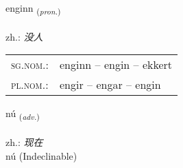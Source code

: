 \documentclass[frontgrid, backgrid]{flacards}\usepackage[]{graphicx}\usepackage[]{xcolor}
\begin{document}
\renewcommand{\flhead}{\vskip5pt \fboxsep=0pt {\small\bfseries\footnotesize Fornafn | 代词}}
\renewcommand{\fcfoot}{\vskip5pt \fboxsep=0pt \hspace{2pt}{\small\bfseries\footnotesize 1K}}

\renewcommand{\blhead}{\vskip5pt {\small\bfseries\footnotesize Fornafn | 代词 }}
\renewcommand{\bcfoot}{\vskip5pt \hspace{2pt}{\small\bfseries\footnotesize 1K}}


{enginn \small{\textsubscript{(\textit{pron.})}} \\[1ex] %
\textphonetic{[eiɲcɪn]} \\
zh.: \emph{没人} \\  [2ex]
\renewcommand*{\arraystretch}{0.8}
\begin{tabular}{ll}
\textsc{sg.nom.}: & enginn  --  engin -- ekkert \\ 
\textsc{pl.nom.}: & engir -- engar -- engin
\end{tabular}
}


\renewcommand{\flhead}{\vskip5pt \fboxsep=0pt {\small\bfseries\footnotesize Atviksorð | 副词}}
\renewcommand{\fcfoot}{\vskip5pt \fboxsep=0pt \hspace{2pt}{\small\bfseries\footnotesize 1K}}

\renewcommand{\blhead}{\vskip5pt {\small\bfseries\footnotesize Atviksorð | 副词 }}
\renewcommand{\bcfoot}{\vskip5pt \hspace{2pt}{\small\bfseries\footnotesize 1K}}


{nú \small{\textsubscript{(\textit{adv.})}} \\[1ex]
\textphonetic{[nuː]} \\
zh.: \emph{现在} \\  [2ex]
nú (Indeclinable)}

\renewcommand{\flhead}{\vskip5pt \fboxsep=0pt {\small\bfseries\footnotesize Sagnorð | 动词}}
\renewcommand{\fcfoot}{\vskip5pt \fboxsep=0pt \hspace{2pt}{\small\bfseries\footnotesize 1K}}
\end{document}
